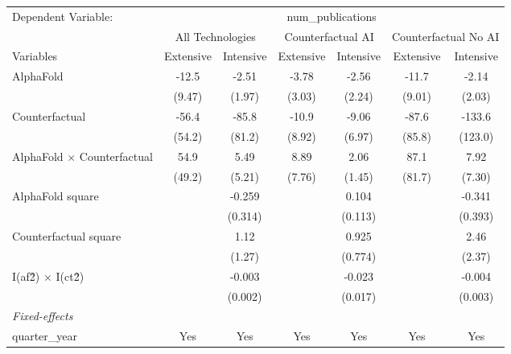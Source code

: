 \begingroup
\centering
\begin{tabular}{lcccccc}
   \tabularnewline \midrule \midrule
   Dependent Variable: & \multicolumn{6}{c}{num\_publications}\\
 & \multicolumn{2}{c}{All Technologies} & \multicolumn{2}{c}{Counterfactual AI} & \multicolumn{2}{c}{Counterfactual No AI} \\
\cmidrule(lr){1-1}\cmidrule(lr){2-3} \cmidrule(lr){4-5} \cmidrule(lr){6-7}
Variables & \multicolumn{1}{c}{Extensive} & \multicolumn{1}{c}{Intensive} & \multicolumn{1}{c}{Extensive} & \multicolumn{1}{c}{Intensive} & \multicolumn{1}{c}{Extensive} & \multicolumn{1}{c}{Intensive} \\
\cmidrule(lr){1-1}\cmidrule(lr){2-2} \cmidrule(lr){3-3} \cmidrule(lr){4-4} \cmidrule(lr){5-5} \cmidrule(lr){6-6} \cmidrule(lr){7-7}
   AlphaFold                          & -12.5  & -2.51   & -3.78  & -2.56   & -11.7  & -2.14\\   
                                      & (9.47) & (1.97)  & (3.03) & (2.24)  & (9.01) & (2.03)\\   
   Counterfactual                     & -56.4  & -85.8   & -10.9  & -9.06   & -87.6  & -133.6\\   
                                      & (54.2) & (81.2)  & (8.92) & (6.97)  & (85.8) & (123.0)\\   
   AlphaFold $\times$ Counterfactual  & 54.9   & 5.49    & 8.89   & 2.06    & 87.1   & 7.92\\   
                                      & (49.2) & (5.21)  & (7.76) & (1.45)  & (81.7) & (7.30)\\   
   AlphaFold square                   &        & -0.259  &        & 0.104   &        & -0.341\\   
                                      &        & (0.314) &        & (0.113) &        & (0.393)\\   
   Counterfactual square              &        & 1.12    &        & 0.925   &        & 2.46\\   
                                      &        & (1.27)  &        & (0.774) &        & (2.37)\\   
   I(af\^2) $\times$ I(ct\^2)         &        & -0.003  &        & -0.023  &        & -0.004\\   
                                      &        & (0.002) &        & (0.017) &        & (0.003)\\   
   \midrule
   \emph{Fixed-effects}\\
   quarter\_year                      & Yes    & Yes     & Yes    & Yes     & Yes    & Yes\\  

\end{tabular}
